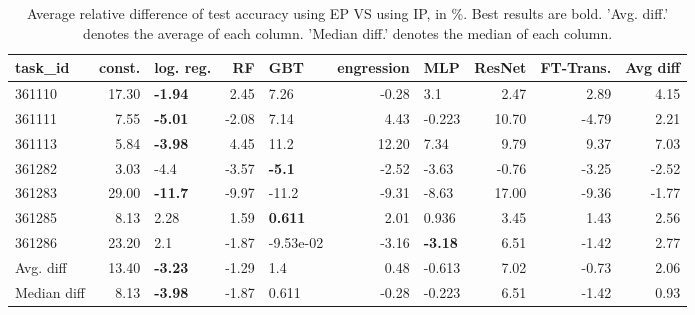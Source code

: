 \begin{table}[ht!]
\centering
\begingroup\footnotesize
\begin{tabular}{lrlrlrlrrr}
  \hline
\hline
task\_id & const. & log. reg. & RF & GBT & engression & MLP & ResNet & FT-Trans. & Avg diff \\ 
  \hline
361110 & 17.30 & \textbf{-1.94} & 2.45 & 7.26 & -0.28 & 3.1 & 2.47 & 2.89 & 4.15 \\ 
  361111 & 7.55 & \textbf{-5.01} & -2.08 & 7.14 & 4.43 & -0.223 & 10.70 & -4.79 & 2.21 \\ 
  361113 & 5.84 & \textbf{-3.98} & 4.45 & 11.2 & 12.20 & 7.34 & 9.79 & 9.37 & 7.03 \\ 
  361282 & 3.03 & -4.4 & -3.57 & \textbf{-5.1} & -2.52 & -3.63 & -0.76 & -3.25 & -2.52 \\ 
  361283 & 29.00 & \textbf{-11.7} & -9.97 & -11.2 & -9.31 & -8.63 & 17.00 & -9.36 & -1.77 \\ 
  361285 & 8.13 & 2.28 & 1.59 & \textbf{0.611} & 2.01 & 0.936 & 3.45 & 1.43 & 2.56 \\ 
  361286 & 23.20 & 2.1 & -1.87 & -9.53e-02 & -3.16 & \textbf{-3.18} & 6.51 & -1.42 & 2.77 \\ 
   \hline
Avg. diff & 13.40 & \textbf{-3.23} & -1.29 & 1.4 & 0.48 & -0.613 & 7.02 & -0.73 & 2.06 \\ 
  Median diff & 8.13 & \textbf{-3.98} & -1.87 & 0.611 & -0.28 & -0.223 & 6.51 & -1.42 & 0.93 \\ 
   \hline
\hline
\end{tabular}
\endgroup
\caption{Average relative difference of test accuracy using EP VS using IP, in \%. 
                  Best results are bold. 
                  'Avg. diff.' denotes the average of each column.
                  'Median diff.' denotes the median of each column.} 
\label{TABLES/table_results_accuracy_gower_num_and_cat_features_EP_VS_IP}
\end{table}
